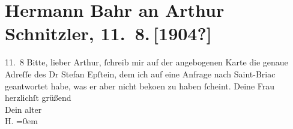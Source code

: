 

         \renewcommand{\erwaehnteWerke}{}
               \section[Hermann Bahr an Arthur Schnitzler, 11. 8. {[}1904?{]}]{ Hermann Bahr an Arthur Schnitzler, 11. 8. {[}1904?{]}}\nopagebreak{}\rehead{ }\begin{ledgroupsized}[t]{13cm}\normalsize\beginnumbering \toendnotes[C]{\smallbreak\pagebreak[2]} 
\toendnotes[C]{\smallbreak}\pstart
           \raggedleft{}{\pb}11. 8\pend
           \pstart
           Bitte, lieber Arthur, ſchreib mir auf der angebogenen Karte die
               genaue Adreſſe des Dr Stefan Epſtein, dem ich auf
               eine Anfrage nach Saint-Briac geantwortet habe, was
               er aber nicht beko{\geminationm}en zu haben ſcheint.\pend
           \pstart
           Deine Frau herzlichſt
               grüßend{\\[\baselineskip]}Dein alter{\\[\baselineskip]}\spacefill\mbox{H.}\pend
           \leftskip=0em{}
         
         \endnumbering{}\end{ledgroupsized}  \newcommand{\dateiname}{L01425}\newcommand{\titel}{Hermann Bahr an Arthur Schnitzler, 11. 8. [1904?]}\newcommand{\editorInnen}{ Kurt Ifkovits,  Martin Anton Müller}
      